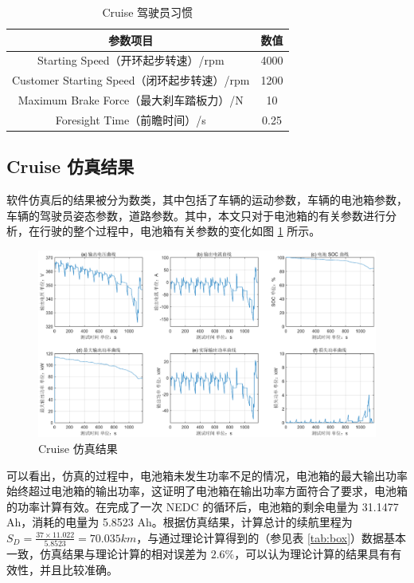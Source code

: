 \begin{table}
	\centering
	\caption{Cruise 驾驶员习惯} \label{tab:driver}
	\begin{tabular*}{0.9\textwidth}{@{\extracolsep{\fill}}cc}
		\toprule
		参数项目			&数值		 \\
		\midrule
		Starting Speed（开环起步转速）/rpm	     &4000     \\
		Customer Starting Speed（闭环起步转速）/rpm &1200  \\
		Maximum Brake Force（最大刹车踏板力）/N      &10   \\
		Foresight Time（前瞻时间）/s      & 0.25      \\
		\bottomrule
	\end{tabular*}
\end{table}

\subsection{Cruise 仿真结果}
软件仿真后的结果被分为数类，其中包括了车辆的运动参数，车辆的电池箱参数，车辆的驾驶员姿态参数，道路参数。其中，本文只对于电池箱的有关参数进行分析，在行驶的整个过程中，电池箱有关参数的变化如图 \ref{fig:result} 所示。

\begin{figure}
	\centering
    \includegraphics[width=1\textwidth]{figures/result.eps}
	\caption{Cruise 仿真结果}\label{fig:result}
\end{figure}

可以看出，仿真的过程中，电池箱未发生功率不足的情况，电池箱的最大输出功率始终超过电池箱的输出功率，这证明了电池箱在输出功率方面符合了要求，电池箱的功率计算有效。在完成了一次 NEDC 的循环后，电池箱的剩余电量为 31.1477 Ah，消耗的电量为 5.8523 Ah。根据仿真结果，计算总计的续航里程为 $S_D=\frac{37 \times 11.022}{5.8523} = 70.035 km$，与通过理论计算得到的（参见表 \ref{tab:box}）数据基本一致，仿真结果与理论计算的相对误差为 $2.6\%$，可以认为理论计算的结果具有有效性，并且比较准确。

